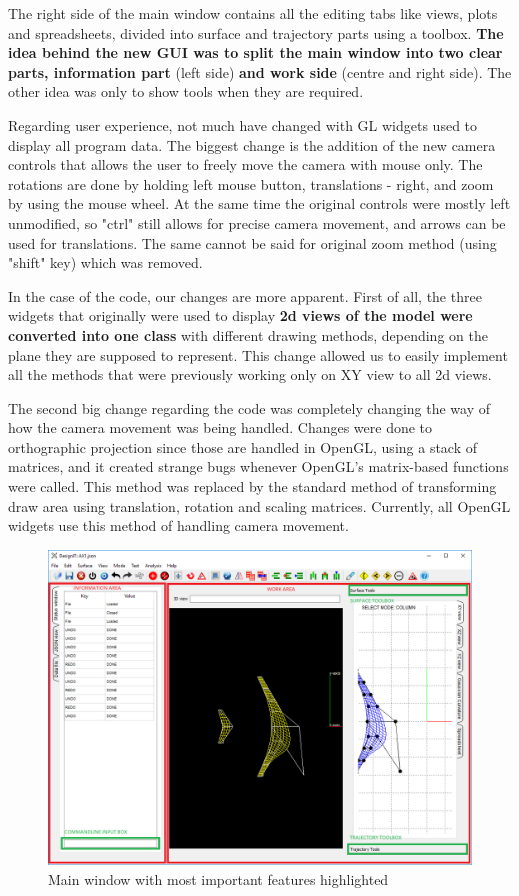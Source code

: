 \documentclass[a4paper, 11pt, article]{report}
\begin{document}
The right side of the main window contains all the editing tabs like views, plots and spreadsheets, divided into surface and trajectory parts using a toolbox. \textbf{The idea behind the new GUI was to split the main window into two clear parts, information part} (left side) \textbf{and work side} (centre and right side). The other idea was only to show tools when they are required.

Regarding user experience, not much have changed with GL widgets used to display all program data. The biggest change is the addition of the new camera controls that allows the user to freely move the camera with mouse only. The rotations are done by holding left mouse button, translations - right, and zoom by using the mouse wheel. At the same time the original controls were mostly left unmodified, so "ctrl" still allows for precise camera movement, and arrows can be used for translations. The same cannot be said for original zoom method (using "shift" key) which was removed.

In the case of the code, our changes are more apparent. First of all, the three widgets that originally were used to display \textbf{2d views of the model were converted into one class} with different drawing methods, depending on the plane they are supposed to represent. This change allowed us to easily implement all the methods that were previously working only on XY view to all 2d views. 

The second big change regarding the code was completely changing the way of how the camera movement was being handled. Changes were done to orthographic projection since those are handled in OpenGL, using a stack of matrices, and it created strange bugs whenever OpenGL's matrix-based functions were called. This method was replaced by the standard method of transforming draw area using translation, rotation and scaling matrices. Currently, all OpenGL widgets use this method of handling camera movement.

\begin{figure}[!h]
	\centering
	
	\includegraphics[width=\textwidth]{images/main_window.png}
	
	\caption{Main window with most important features highlighted}
	
	\label{gui_surface}
\end{figure}
\end{document}
